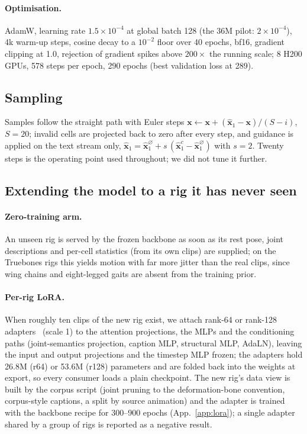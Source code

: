\paragraph{Optimisation.} AdamW, learning rate $1.5\times10^{-4}$ at global batch 128 (the
\num{36}M pilot: $2\times10^{-4}$), 4k warm-up steps, cosine decay to a $10^{-2}$ floor over 40
epochs, bf16, gradient clipping at 1.0, rejection of gradient spikes above $200\times$ the running
scale; 8 H200 GPUs, \num{578} steps per epoch, \num{290} epochs (best validation loss at 289).

\subsection{Sampling}\label{sec:method:sampling}
Samples follow the straight path with Euler steps
$\mathbf{x}\leftarrow\mathbf{x}+(\hat{\mathbf{x}}_1-\mathbf{x})/(S-i)$, $S{=}20$; invalid cells are
projected back to zero after every step, and guidance is applied on the text stream only,
$\hat{\mathbf{x}}_1=\hat{\mathbf{x}}_1^{\varnothing}+s\,(\hat{\mathbf{x}}_1^{c}-\hat{\mathbf{x}}_1^{\varnothing})$
with $s{=}2$. Twenty steps is the operating point used throughout; we did not tune it further.

\subsection{Extending the model to a rig it has never seen}\label{sec:method:lora}
\paragraph{Zero-training arm.} An unseen rig is served by the frozen backbone as soon as its rest
pose, joint descriptions and per-cell statistics (from its own clips) are supplied; on the Truebones
rigs this yields motion with far more jitter than the real clips, since wing chains and eight-legged
gaits are absent from the training prior.

\paragraph{Per-rig LoRA.} When roughly ten clips of the new rig exist, we attach rank-64 or rank-128
adapters~\citep{hu2022lora} (scale 1) to the attention projections, the MLPs and the conditioning
paths (joint-semantics projection, caption MLP, structural MLP, AdaLN), leaving the input and output
projections and the timestep MLP frozen; the adapters hold 26.8M (r64) or 53.6M (r128) parameters
and are folded back into the weights at export, so every consumer loads a plain checkpoint. The
new rig's data view is built by the corpus script (joint pruning to the deformation-bone convention,
corpus-style captions, a split by source animation) and the adapter is trained with the backbone
recipe for 300--900 epochs (App.~\ref{app:lora}); a single adapter shared by a group of rigs is
reported as a negative result.

